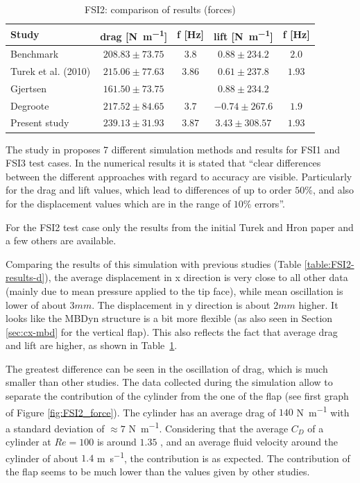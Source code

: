 \begin{table}[!htb]
	\begin{center}
		\begin{tabular}{ l | c c | c c  |  } 
			Study & drag [\si{N.m^{-1}}] & f [\si{Hz}] & lift [\si{N.m^{-1}}] & f [\si{Hz}]    \\ 
			\hline
			\hline
			Benchmark  \cite{turek2006proposal} & $208.83\pm73.75$ & $3.8$ & $0.88\pm234.2$ & $2.0$     \\
			Turek et al. (2010) \cite{turek2010numerical} & $215.06\pm77.63$ & $3.86$ & $0.61\pm237.8$ & $1.93$\\   
			Gjertsen \cite{gjertsen2017development} & $161.50\pm73.75$ & & $0.88\pm234.2$ & \\
			Degroote \cite{degroote2009interface}  & $217.52\pm84.65$ & $3.7$ & $-0.74\pm267.6$ & $1.9$ \\
			\hline
			Present study & $239.13\pm31.93$ & $3.87$ & $3.43\pm308.57$ & $1.93$ \\
		\end{tabular}
	\end{center}
	\caption{FSI2: comparison of results (forces)}
	\label{table:FSI2-results-f}
\end{table}


The study in \cite{turek2010numerical} proposes 7 different simulation methods and results for FSI1 and FSI3 test cases. In the numerical results it is stated that ``clear differences between the different approaches with regard to accuracy are visible. Particularly for the drag and lift values, which lead to differences of up to order $50\%$, and also for the displacement values which are in the range of $10\%$ errors''.

For the FSI2 test case only the results from the initial Turek and Hron paper \cite{turek2006proposal} and a few others are available.

Comparing the results of this simulation with previous studies (Table \ref{table:FSI2-results-d}), the average displacement in x direction is very close to all other data (mainly due to mean pressure applied to the tip face), while mean oscillation is lower of about $3mm$. The displacement in y direction is about $2mm$ higher. It looks like the MBDyn structure is a bit more flexible (as also seen in Section \ref{sec:cx-mbd} for the vertical flap). This also reflects the fact that average drag and lift are higher, as shown in Table~\ref{table:FSI2-results-f}.

The greatest difference can be seen in the oscillation of drag, which is much smaller than other studies. The data collected during the simulation allow to separate the contribution of the cylinder from the one of the flap (see first graph of Figure \ref{fig:FSI2_force}). The cylinder has an average drag of $140$ \si{N.m^{-1}} with a standard deviation of $\approx7$ \si{N.m^{-1}}. Considering that the average $C_D$ of a cylinder at $Re=100$ is around $1.35$ \cite{qin2017direct}, and an average fluid velocity around the cylinder of about $1.4$ \si{m.s^{-1}}, the contribution is as expected. The contribution of the flap seems to be much lower than the values given by other studies.

